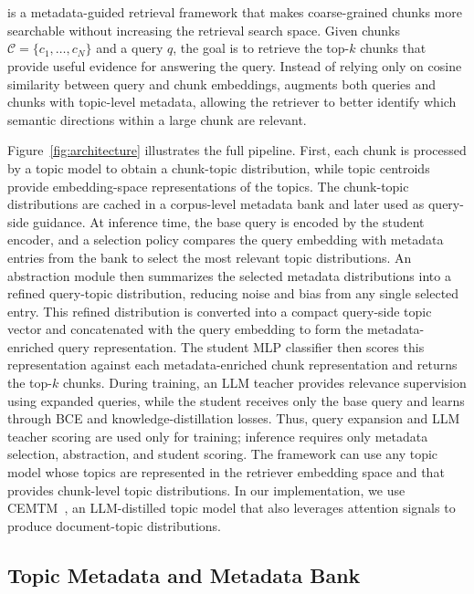 \section{\name{}}

\name{} is a metadata-guided retrieval framework that makes coarse-grained chunks more searchable without increasing the retrieval search space. Given chunks $\mathcal{C}=\{c_1,\ldots,c_N\}$ and a query $q$, the goal is to retrieve the top-$k$ chunks that provide useful evidence for answering the query. Instead of relying only on cosine similarity between query and chunk embeddings, \name{} augments both queries and chunks with topic-level metadata, allowing the retriever to better identify which semantic directions within a large chunk are relevant.

Figure~\ref{fig:architecture} illustrates the full pipeline. First, each chunk is processed by a topic model to obtain a chunk-topic distribution, while topic centroids provide embedding-space representations of the topics. The chunk-topic distributions are cached in a corpus-level metadata bank and later used as query-side guidance. At inference time, the base query is encoded by the student encoder, and a selection policy compares the query embedding with metadata entries from the bank to select the most relevant topic distributions. An abstraction module then summarizes the selected metadata distributions into a refined query-topic distribution, reducing noise and bias from any single selected entry. This refined distribution is converted into a compact query-side topic vector and concatenated with the query embedding to form the metadata-enriched query representation. The student MLP classifier then scores this representation against each metadata-enriched chunk representation and returns the top-$k$ chunks. During training, an LLM teacher provides relevance supervision using expanded queries, while the student receives only the base query and learns through BCE and knowledge-distillation losses. Thus, query expansion and LLM teacher scoring are used only for training; inference requires only metadata selection, abstraction, and student scoring. The framework can use any topic model whose topics are represented in the retriever embedding space and that provides chunk-level topic distributions. In our implementation, we use CEMTM~\cite{abaskohi-etal-2025-cemtm}, an LLM-distilled topic model that also leverages attention signals to produce document-topic distributions.

\subsection{Topic Metadata and Metadata Bank}
\label{sec:metadata_bank}


